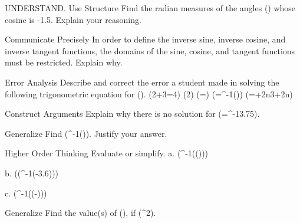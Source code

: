 \documentclass{article}
\newenvironment{practice}[2]{}{}        %
\newcommand{\answer}[1]{}               %
\newcommand{\placeholder}[2]{}          %
\newcommand{\te}[1]{}                   %
\begin{document}
\begin{practice}{11}{2}
UNDERSTAND. Use Structure Find the radian measures of the angles (\theta) whose cosine is -1.5. Explain your reasoning.
\answer{There are no such angles for (\theta) whose cosine is -1.5 because-1.5 is not an element of the domain of cosine.}
\te{Printed domain of cosine; likely range of cosine.}
\end{practice}
\begin{practice}{12}{2}
Communicate Precisely In order to define the inverse sine, inverse cosine, and inverse tangent functions, the domains of the sine, cosine, and tangent functions must be restricted. Explain why.
\answer{The inverse relations would not be functions because there would be multiple y-values for the same x-value.}
\end{practice}
\begin{practice}{13}{2}
Error Analysis Describe and correct the error a student made in solving the following trigonometric equation for (\theta).
(2\sin\theta+3=4)
(2\sin{})
(\sin\theta=)
(\theta=\sin^{-1}())
(\theta=\frac{}+2\pi n\frac{5\pi}3+2\pi n)
\placeholder{illustration}{Palegraycurledstudentworknote,redX atlowerright;fiveequationlines transcribedabove.}
\answer{The student gave values for (\theta=\cos^{-1}(\frac12)), rather than sine. The correct answer is (\theta=\frac\pi6+2\pi n) or (\frac{5\pi}6+2\pi n) where n is an integer.}
\end{practice}
\begin{practice}{14}{2}
Construct Arguments Explain why there is no solution for (\theta=\cos^{-1}3.75).
\answer{Cosine (\theta) is never greater than 1.}
\end{practice}
\begin{practice}{15}{2}
Generalize Find (\sec^{-1}()). Justify your answer.
\answer{(\sec^{-1}(\frac12)) does not exist, since (\sec x=\frac1{\cos x}) and (\cos x) cannot equal2.}
\end{practice}
\begin{practice}{16}{2}
Higher Order Thinking Evaluate or simplify.
a. (\cos^{-1}(\cos(\frac{})))
\answer{a. (\frac\pi8)}
b. (\tan(\tan^{-1}(-3.6)))
\answer{b.-3.6}
c. (\sin^{-1}(\tan(-\frac{})))
\answer{c. (-\frac\pi2)}
\end{practice}
\begin{practice}{17}{1}
Generalize Find the value(s) of (\sin\theta), if (\sin^2).
\answer{(\sin\theta=\pm1)}
\end{practice}
\end{document}

